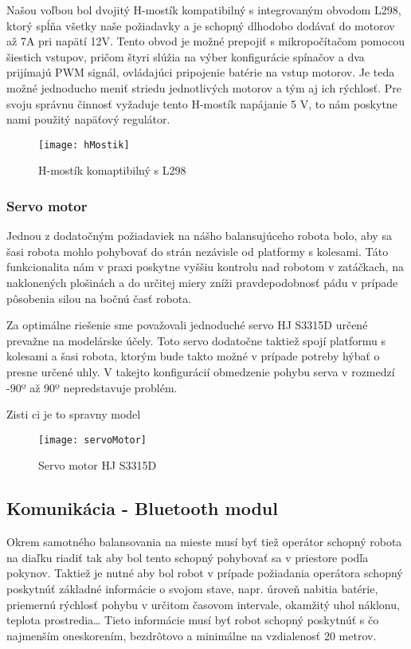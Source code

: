 Našou voľbou bol dvojitý H-mostík kompatibilný s integrovaným obvodom L298, ktorý spĺňa všetky naše požiadavky a je schopný dlhodobo dodávať do motorov až 7A pri napätí 12V. Tento obvod je možné prepojiť s mikropočítačom pomocou šiestich vstupov, pričom štyri slúžia na výber konfigurácie spínačov a dva prijímajú PWM signál, ovládajúci pripojenie batérie na vstup motorov. Je teda možné jednoducho meniť striedu jednotlivých motorov a tým aj ich rýchlosť. Pre svoju správnu činnosť vyžaduje tento H-mostík napájanie 5 V, to nám poskytne nami použitý napäťový regulátor.  

\begin{figure}
\centering
\texttt{[image: hMostik]}
\caption{H-mostík komaptibilný s L298}
\label{fig:hMostik}
\end{figure}

\subsubsection{Servo motor}
Jednou z dodatočným požiadaviek na nášho balansujúceho robota bolo, aby sa šasi robota mohlo pohybovať do strán nezávisle od platformy s kolesami. Táto funkcionalita nám v praxi poskytne vyššiu kontrolu nad robotom v zatáčkach, na naklonených plošinách a do určitej miery zníži pravdepodobnosť pádu v prípade pôsobenia silou na bočnú časť robota.

Za optimálne riešenie sme považovali jednoduché servo HJ S3315D určené prevažne na modelárske účely. Toto servo dodatočne taktiež spojí platformu s kolesami a šasi robota, ktorým bude takto možné v prípade potreby hýbať o presne určené uhly. V takejto konfigurácií  obmedzenie pohybu serva v rozmedzí -90º až 90º nepredstavuje problém.

\todo [inline] Zisti ci je to spravny model

\begin{figure}
\centering
\texttt{[image: servoMotor]}
\caption{Servo motor HJ S3315D}
\label{fig:servoMotor}
\end{figure}

\subsection{Komunikácia - Bluetooth modul}
Okrem samotného balansovania na mieste musí byť tiež operátor schopný robota na diaľku riadiť tak aby bol tento schopný pohybovať sa v priestore podľa pokynov. Taktiež je nutné aby bol robot v prípade požiadania operátora schopný poskytnúť základné informácie o svojom stave, napr. úroveň nabitia batérie, priemernú rýchlosť pohybu v určitom časovom intervale, okamžitý uhol náklonu, teplota prostredia… Tieto informácie musí byť robot schopný poskytnúť s čo najmenším oneskorením, bezdrôtovo a minimálne na vzdialenosť 20 metrov.  


